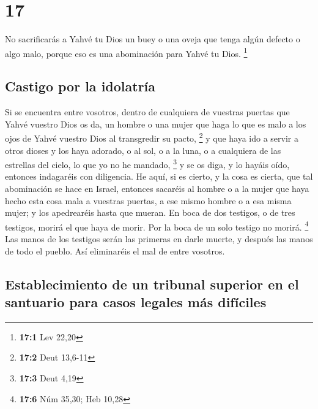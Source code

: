 \hypertarget{section-16}{%
\section{17}\label{section-16}}

 No sacrificarás a Yahvé tu Dios un buey o una oveja que
tenga algún defecto o algo malo, porque eso es una abominación para
Yahvé tu Dios. \footnote{\textbf{17:1} Lev 22,20}

\hypertarget{castigo-por-la-idolatruxeda}{%
\subsection{Castigo por la
idolatría}\label{castigo-por-la-idolatruxeda}}

 Si se encuentra entre vosotros, dentro de cualquiera de
vuestras puertas que Yahvé vuestro Dios os da, un hombre o una mujer que
haga lo que es malo a los ojos de Yahvé vuestro Dios al transgredir su
pacto, \footnote{\textbf{17:2} Deut 13,6-11}  y que haya
ido a servir a otros dioses y los haya adorado, o al sol, o a la luna, o
a cualquiera de las estrellas del cielo, lo que yo no he mandado,
\footnote{\textbf{17:3} Deut 4,19}  y se os diga, y lo
hayáis oído, entonces indagaréis con diligencia. He aquí, si es cierto,
y la cosa es cierta, que tal abominación se hace en Israel,
 entonces sacaréis al hombre o a la mujer que haya hecho
esta cosa mala a vuestras puertas, a ese mismo hombre o a esa misma
mujer; y los apedrearéis hasta que mueran.  En boca de dos
testigos, o de tres testigos, morirá el que haya de morir. Por la boca
de un solo testigo no morirá. \footnote{\textbf{17:6} Núm 35,30; Heb
  10,28}  Las manos de los testigos serán las primeras en
darle muerte, y después las manos de todo el pueblo. Así eliminaréis el
mal de entre vosotros.

\hypertarget{establecimiento-de-un-tribunal-superior-en-el-santuario-para-casos-legales-muxe1s-difuxedciles}{%
\subsection{Establecimiento de un tribunal superior en el santuario para
casos legales más
difíciles}\label{establecimiento-de-un-tribunal-superior-en-el-santuario-para-casos-legales-muxe1s-difuxedciles}}

